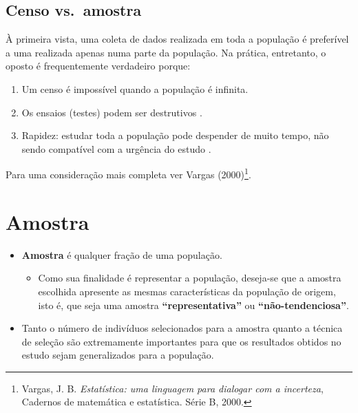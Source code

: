 \documentclass[]{tufte-book}
\providecommand{\tightlist}{%
  \setlength{\itemsep}{0pt}\setlength{\parskip}{0pt}}
\begin{document}
\hypertarget{censo-vs.-amostra}{%
\subsection{Censo vs.~amostra}\label{censo-vs.-amostra}}

À primeira vista, uma coleta de dados realizada em toda a população é
preferível a uma realizada apenas numa parte da população. Na prática,
entretanto, o oposto é frequentemente verdadeiro porque:

\begin{enumerate}
\def\labelenumi{\arabic{enumi}.}
\tightlist
\item
  Um censo é impossível quando a população é infinita.
\item
  Os ensaios (testes) podem ser destrutivos
  .
\item
  Rapidez: estudar toda a população pode despender de muito tempo, não
  sendo compatível com a urgência do estudo
  .
\end{enumerate}

Para uma consideração mais completa ver Vargas
(2000)\footnote{Vargas, J. B. \emph{Estatística: uma linguagem para dialogar com a incerteza}, Cadernos de matemática e estatística. Série B, 2000.}.

\hypertarget{amostra}{%
\section{Amostra}\label{amostra}}

\begin{itemize}
\tightlist
\item
  \textbf{Amostra} é qualquer fração de uma população.

  \begin{itemize}
  \tightlist
  \item
    Como sua finalidade é representar a população, deseja-se que a
    amostra escolhida apresente as mesmas características da população
    de origem, isto é, que seja uma amostra \textbf{``representativa''}
    ou \textbf{``não-tendenciosa''}.
  \end{itemize}
\item
  Tanto o número de indivíduos selecionados para a amostra quanto a
  técnica de seleção são extremamente importantes para que os resultados
  obtidos no estudo sejam generalizados para a população.
\end{itemize}
\end{document}
